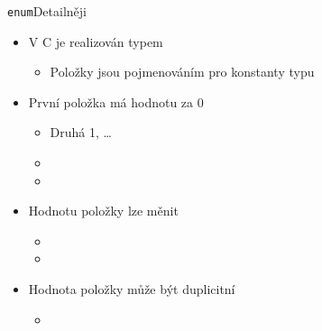 \begin{frame}{\texttt{enum}}{Detailněji}

  \begin{itemize}
    \item V C je  realizován typem 
    \begin{itemize}
      \item Položky jsou pojmenováním pro konstanty typu 
    \end{itemize}

    \pause

    \item První položka má hodnotu za 0
    \begin{itemize}
      \item Druhá 1, \dots

      \pause

      \item {}
	\item {}
    \end{itemize}

    \pause

    \item Hodnotu položky lze měnit
    \begin{itemize}
      \item {}
	\item {}
    \end{itemize}

    \pause

    \item Hodnota položky může být duplicitní
    \begin{itemize}
      \item {}
    \end{itemize}

  \end{itemize}

\end{frame}


